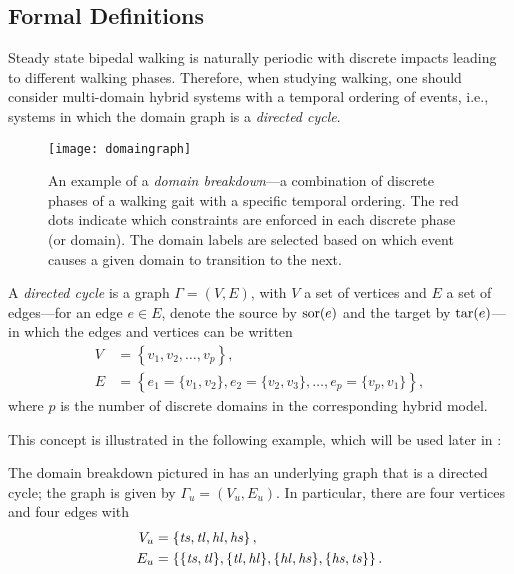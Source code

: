 \subsection{Formal Definitions}

Steady state bipedal walking is naturally periodic with discrete impacts leading
to different walking phases.
%
Therefore, when studying walking, one should consider multi-domain hybrid
systems with a temporal ordering of events, i.e., systems in which the domain
graph is a {\em directed cycle}.

\begin{figure}[t]
  \centering
  \texttt{[image: domaingraph]}
  \caption[An example of a {\em domain breakdown}]{An example of a {\em domain
      breakdown}---a combination of discrete phases of a walking gait with a
    specific temporal ordering. The red dots indicate which constraints are
    enforced in each discrete phase (or domain).
    The domain labels are selected based on which event causes a given domain to
    transition to the next.}
  \label{fig:domaingraph}
\end{figure}

\begin{definition}
  A {\em directed cycle} is a graph $\Gamma = (V, E)$, with $V$ a set of
  vertices and $E$ a set of edges---for an edge $e \in E$, denote the source by
  $\mathrm{sor}(e)$ and the target by $\mathrm{tar}(e)$---in which the edges and vertices can be
  written
  \begin{align}
    \nonumber
    V &= \left\{v_{1}, v_{2}, \ldots, v_{p}\right\},\\
    \label{eqn:directedcyclep}
    E &= \left\{e_{1} = \{v_{1}, v_{2}\}, e_{2} = \{v_{2}, v_{3}\}, \ldots,
      e_{p} = \{v_{p}, v_{1}\}\right\},
  \end{align}
  where $p$ is the number of discrete domains in the corresponding hybrid
  model.
\end{definition}

This concept is illustrated in the following example, which will be used later
in :

\begin{exmp} \label{universalgraph}
  The domain breakdown pictured in  has an underlying
  graph that is a directed cycle;
  the graph is given by $\Gamma_{u} = (V_{u}, E_{u})$.
  In particular, there are four vertices and four edges with
  \begin{align}
    \nonumber
    V_u &= \left\{\mathit{ts}, \mathit{tl}, \mathit{hl}, \mathit{hs}\right\},\\
    E_u &= \left\{\{\mathit{ts}, \mathit{tl}\}, \{\mathit{tl}, \mathit{hl}\}, \{\mathit{hl}, \mathit{hs}\}, \{\mathit{hs},
      \mathit{ts}\}\right\}.
  \end{align}
\end{exmp}

